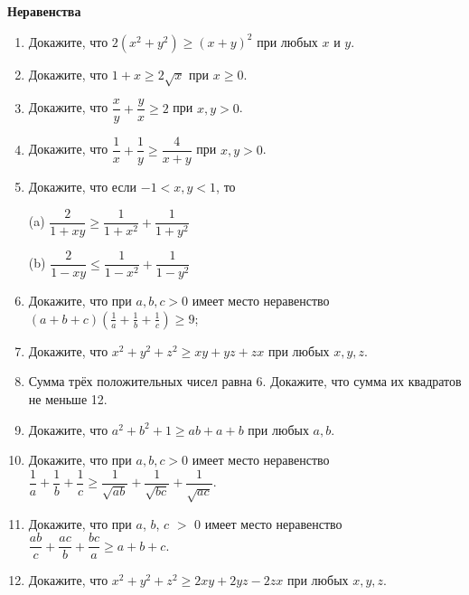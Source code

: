 \documentclass{article}
\begin{document}
\large
	
	
\begin{center}
\textbf{Неравенства}
\end{center}

\begin{enumerate}[label*=\protect\fbox{\arabic{enumi}}]

\item Докажите, что  $2(x^2 + y^2) \geqslant (x + y)^2$  при любых $x$ и $y$.

\item Докажите, что $1+x\geqslant 2\sqrt{x}$ при $x \ge 0$.

\item Докажите, что  $\dfrac{x}{y} + \dfrac{y}{x} \geqslant 2$  при  $x, y > 0$.

\item Докажите, что $\dfrac{1}{x}+\dfrac{1}{y}\geqslant\dfrac{4}{x+y}$ при $x, y > 0$.

\item Докажите, что если $-1 < x, y < 1$, то

(a) $\dfrac{2}{1+x y} \geqslant \dfrac{1}{1+x^{2}}+\dfrac{1}{1+y^{2}}$

(b) $\dfrac{2}{1-x y} \leqslant \dfrac{1}{1-x^{2}}+\dfrac{1}{1-y^{2}}$

\item  Докажите, что при $a, b, c > 0$ имеет место неравенство $\displaystyle (a+b+c)\left(\frac{1}{a} + \frac{1}{b} + \frac{1}{c}\right) \geq 9$;

\item Докажите, что  $x^2 + y^2 + z^2 \ge xy + yz + zx$ при любых $x, y, z$.

\item Сумма трёх положительных чисел равна 6. Докажите, что сумма их квадратов не меньше 12.

\item Докажите, что $a^2 + b^2 + 1 \ge ab + a + b$ при любых $a, b$.

\item Докажите, что при $a, b, c > 0$ имеет место неравенство $\dfrac{1}{a}+\dfrac{1}{b}+\dfrac{1}{c}\ge\dfrac{1}{\sqrt{ab}}+\dfrac{1}{\sqrt{bc}}+\dfrac{1}{\sqrt{ac}}.$  

\item Докажите, что при  $a$, $b$, $c$ $>$ $0$  имеет место неравенство $\dfrac{ab}{c}+\dfrac{ac}{b}+\dfrac{bc}{a}\ge a+b+c.$
\item Докажите, что  $x^2 + y^2 + z^2 \ge 2xy + 2yz - 2zx$  при любых $x, y, z$.


\end{enumerate}
\end{document}
